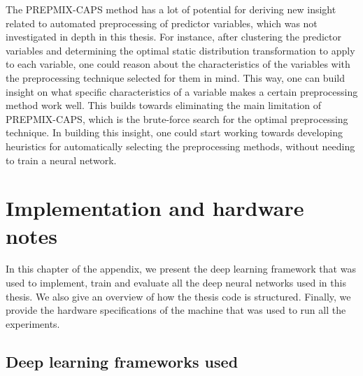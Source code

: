 \documentclass{statsmsc}
\begin{document}
{%
The \ac{PREPMIX-CAPS} method has a lot of potential for deriving new insight
related to automated preprocessing of predictor variables, which was not
investigated in depth in this thesis. For instance, after clustering the
predictor variables and determining the optimal static distribution
transformation to apply to each variable, one could reason about the characteristics
of the variables with the preprocessing technique selected for
them in mind. This way, one can build insight on what specific characteristics of a
variable makes a certain preprocessing method work well.
This builds towards eliminating the main limitation of \ac{PREPMIX-CAPS}, which
is the brute-force search for the optimal preprocessing technique. In building
this insight, one could start working towards developing heuristics for
automatically selecting the preprocessing methods, without needing to train a
neural network.


\clearpage
\renewcommand*{\thepage}{A\arabic{page}}

\appendix

\chapter{Implementation and hardware notes}%
\label{cha:imp_notes}

In this chapter of the appendix, we present the deep learning framework that was used to
implement, train and evaluate all the deep neural networks used in this thesis. We also
give an overview of how the thesis code is structured. Finally, we provide the hardware
specifications of the machine that was used to run all the experiments.

\section{Deep learning frameworks used}%
\label{sec:Deep learning frameworks used}

}
\end{document}
